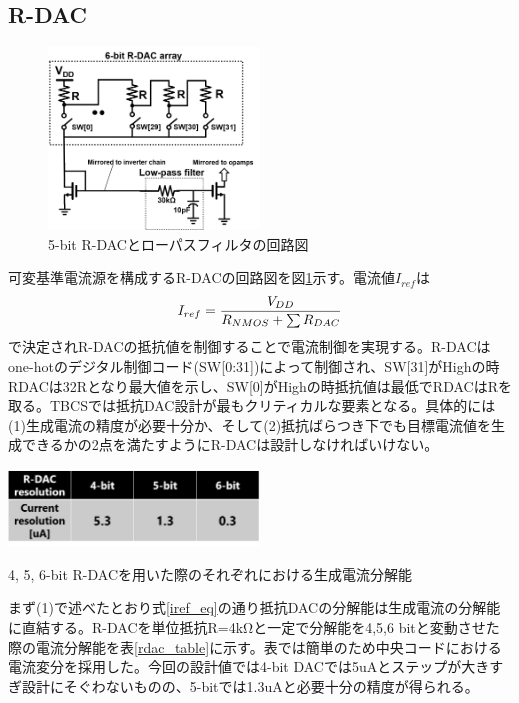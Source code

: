 \documentclass[letterpaper, 10 pt, conference]{ieeeconf}  %
\begin{document}
\subsection{R-DAC}
\begin{figure}[!]
\centering
 \includegraphics[width=0.5\textwidth]{figs/rdac.png}
  \caption{5-bit R-DACとローパスフィルタの回路図}
\label{rdac_sche}
\end{figure}
可変基準電流源を構成するR-DACの回路図を図\ref{rdac_sche}示す。電流値$I_{ref}$は
\begin{eqnarray}
    \centering
     I_{ref} = \frac{V_{DD}}{R_{NMOS}+\sum R_{DAC}}
    \label{iref_eq}
\end{eqnarray}
で決定されR-DACの抵抗値を制御することで電流制御を実現する。R-DACはone-hotのデジタル制御コード(SW[0:31])によって制御され、SW[31]がHighの時RDACは32Rとなり最大値を示し、SW[0]がHighの時抵抗値は最低でRDACはRを取る。TBCSでは抵抗DAC設計が最もクリティカルな要素となる。具体的には(1)生成電流の精度が必要十分か、そして(2)抵抗ばらつき下でも目標電流値を生成できるかの2点を満たすようにR-DACは設計しなければいけない。

\begin{table}[]
\centering
 \includegraphics[width=0.5\textwidth]{figs/rdac_table.png}
  \caption{4, 5, 6-bit R-DACを用いた際のそれぞれにおける生成電流分解能}
\label{rdac_table}
\end{table}

まず(1)で述べたとおり式\ref{iref_eq}の通り抵抗DACの分解能は生成電流の分解能に直結する。R-DACを単位抵抗R=4kΩと一定で分解能を4,5,6 bitと変動させた際の電流分解能を表\ref{rdac_table}に示す。表では簡単のため中央コードにおける電流変分を採用した。今回の設計値では4-bit DACでは5uAとステップが大きすぎ設計にそぐわないものの、5-bitでは1.3uAと必要十分の精度が得られる。
\end{document}
